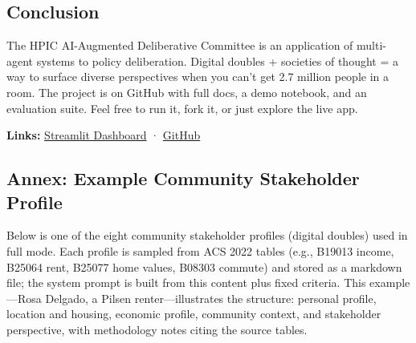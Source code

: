 \documentclass[
  11pt,
]{article}
\begin{document}
\subsection{Conclusion}\label{conclusion}

The HPIC AI-Augmented Deliberative Committee is an application of
multi-agent systems to policy deliberation. Digital doubles + societies
of thought = a way to surface diverse perspectives when you can't get
2.7 million people in a room. The project is on GitHub with full docs, a
demo notebook, and an evaluation suite. Feel free to run it, fork it, or
just explore the live app.

\textbf{Links:}
\href{https://ai-augmetnted-deliberative-committee-hpic.streamlit.app}{Streamlit
Dashboard} ·
\href{https://github.com/anfelipecb/AI-Augmetnted-Deliberative-Committee}{GitHub}

\subsection{Annex: Example Community Stakeholder
Profile}\label{annex-example-community-stakeholder-profile}

Below is one of the eight community stakeholder profiles (digital
doubles) used in full mode. Each profile is sampled from ACS 2022 tables
(e.g., B19013 income, B25064 rent, B25077 home values, B08303 commute)
and stored as a markdown file; the system prompt is built from this
content plus fixed criteria. This example---Rosa Delgado, a Pilsen
renter---illustrates the structure: personal profile, location and
housing, economic profile, community context, and stakeholder
perspective, with methodology notes citing the source tables.
\end{document}
